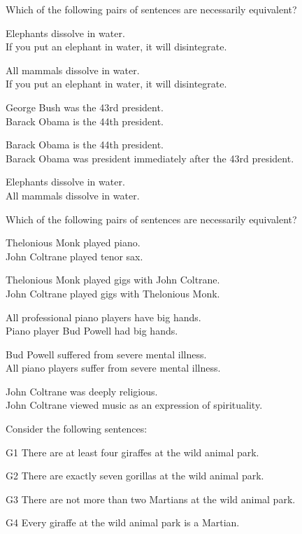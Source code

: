 \problempart Which of the following pairs of sentences are necessarily  equivalent? 

\begin{compactlist}
\item Elephants dissolve in water.	\\
	If you put an elephant in water, it will disintegrate.
\item All mammals dissolve in water.\\		
	If you put an elephant in water, it will disintegrate.
\item George Bush was the 43rd president. \\
	 Barack Obama is the 44th president.
\item Barack Obama is the 44th president. \\
	  Barack Obama was president immediately after the 43rd president.
\item Elephants dissolve in water. 	\\	
	All mammals dissolve in water.
\end{compactlist}
\problempart Which of the following pairs of sentences are necessarily equivalent? 

\begin{compactlist}
\item  Thelonious Monk played piano.	\\
	John Coltrane played tenor sax.
\item  Thelonious Monk played gigs with John Coltrane.	\\
	John Coltrane played gigs with Thelonious Monk.
\item  All professional piano players have big hands.	\\
	Piano player Bud Powell had big hands.
\item  Bud Powell suffered from severe mental illness.	 \\
	All piano players suffer from severe mental illness.
\item John Coltrane was deeply religious.	 \\
John Coltrane viewed music as an expression of spirituality.
\end{compactlist}

\noindent \problempart Consider the following sentences: 
\begin{compactlist}%
\item[G1] \label{itm:at_least_four}There are at least four giraffes at the wild animal park.
\item[G2] \label{itm:exactly_seven} There are exactly seven gorillas at the wild animal park.
\item[G3] \label{itm:not_more_than_two} There are not more than two Martians at the wild animal park.
\item[G4] \label{itm:martians} Every giraffe at the wild animal park is a Martian.
\end{compactlist}

